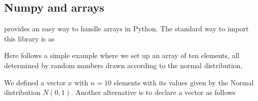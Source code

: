\documentclass[letterpaper,10pt,english]{sphinxmanual}
\begin{document}
\subsection{Numpy and arrays}
\label{\detokenize{chapter2:numpy-and-arrays}}
 provides an easy way to handle arrays in Python. The standard way to import this library is as

\begin{sphinxVerbatim}[commandchars=\\\{\}]
   
\end{sphinxVerbatim}

Here follows a simple example where we set up an array of ten elements, all determined by random numbers drawn according to the normal distribution,

\begin{sphinxVerbatim}[commandchars=\\\{\}]
  
  
\end{sphinxVerbatim}

\begin{sphinxVerbatim}
\end{sphinxVerbatim}

We defined a vector \(x\) with \(n=10\) elements with its values given by the Normal distribution \(N(0,1)\).
Another alternative is to declare a vector as follows

\begin{sphinxVerbatim}[commandchars=\\\{\}]
   
  \PYG{p}{[}  \PYG{p}{]}
\end{sphinxVerbatim}

\begin{sphinxVerbatim}[commandchars=\\\{\}]
[1 2 3]
\end{sphinxVerbatim}
\end{document}
